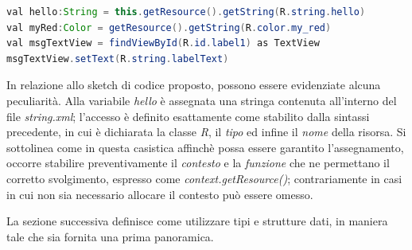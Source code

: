 \documentclass{article}
\begin{document}
\begin{enumerate}
    \begin{lstlisting}[language=JAVA, title=Accesso al contenuto delle risorse mediante Kotlin]
val hello:String = this.getResource().getString(R.string.hello)
val myRed:Color = getResource().getString(R.color.my_red)
val msgTextView = findViewById(R.id.label1) as TextView
msgTextView.setText(R.string.labelText)
    \end{lstlisting}    
In relazione allo sketch di codice proposto, possono essere evidenziate alcuna peculiarità. Alla variabile \textit{hello} è assegnata una stringa contenuta all'interno del file \textit{string.xml}; l'accesso è definito esattamente come stabilito dalla sintassi precedente, in cui è dichiarata la classe \textit{R}, il \textit{tipo} ed infine il \textit{nome} della risorsa. Si sottolinea come in questa casistica affinchè possa essere garantito l'assegnamento, occorre stabilire preventivamente il \textit{contesto} e la \textit{funzione} che ne permettano il corretto svolgimento, espresso come \textit{context.getResource()}; contrariamente in casi in cui non sia necessario allocare il contesto può essere omesso.
\end{enumerate}\vspace*{7pt}
La sezione successiva definisce come utilizzare tipi e strutture dati, in maniera tale che sia fornita una prima panoramica.
\end{document}

